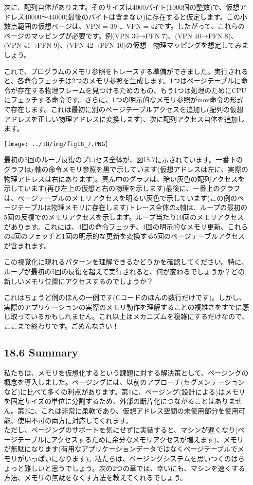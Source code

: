次に、配列自体があります。そのサイズは4000バイト(1000個の整数)で、仮想アドレス40000〜44000(最後のバイトは含まない)に存在すると仮定します。この小数点範囲の仮想ページは、VPN
= 39 \ldots{} VPN =
42です。したがって、これらのページのマッピングが必要です。例(VPN 39→PFN
7)、(VPN 40→PFN 8)、(VPN 41→PFN 9)、(VPN 42→PFN 10)の仮想 -
物理マッピングを想定してみましょう。

これで、プログラムのメモリ参照をトレースする準備ができました。実行されると、各命令フェッチは2つのメモリ参照を生成します。1つはページテーブルに命令が存在する物理フレームを見つけるためのもの、もう1つは処理のためにCPUにフェッチする命令です。さらに、1つの明示的なメモリ参照がmov命令の形式で存在します。これは最初に別のページテーブルアクセスを追加し(配列の仮想アドレスを正しい物理アドレスに変換します)、次に配列アクセス自体を追加します。

\texttt{[image: ../18/img/fig18\_7.PNG]}

最初の5回のループ反復のプロセス全体が、図18.7に示されています。一番下のグラフはy軸の命令メモリ参照を黒で示しています(仮想アドレスは左に、実際の物理アドレスは右にあります)。真ん中のグラフは、暗い灰色の配列アクセスを示しています(再び左上の仮想と右の物理を示します)最後に、一番上のグラフは、ページテーブルのメモリアクセスを明るい灰色で示しています(この例のページテーブルは物理メモリに存在します)トレース全体のx軸は、ループの最初の5回の反復でのメモリアクセスを示します。ループ当たり10回のメモリアクセスがあります。これには、4回の命令フェッチ、1回の明示的なメモリ更新、これらの4回のフェッチと1回の明示的な更新を変換する5回のページテーブルアクセスが含まれます。

この視覚化に現れるパターンを理解できるかどうかを確認してください。特に、ループが最初の5回の反復を超えて実行されると、何が変わるでしょうか？どの新しいメモリ位置にアクセスするのでしょうか？

これはちょうど例のほんの一例です(Cコードのほんの数行だけです)。しかし、実際のアプリケーションの実際のメモリ動作を理解することの複雑さをすでに感じ取っているかもしれません。これ以上はメカニズムを複雑にするだけなので、ここまで終わりです。ごめんなさい！

\hypertarget{summary-11}{%
\subsection*{18.6 Summary}\label{summary-11}}

私たちは、メモリを仮想化するという課題に対する解決策として、ページングの概念を導入しました。ページングには、以前のアプローチ(セグメンテーションなど)に比べて多くの利点があります。第1に、ページング(設計による)はメモリを固定サイズの単位に分割するため、外部の断片化につながることはありません。第2に、これは非常に柔軟であり、仮想アドレス空間の未使用部分を使用可能、使用不可の両方に対応してくれます。\\
ただし、ページングのサポートを気にせずに実装すると、マシンが遅くなり(ページテーブルにアクセスするために余分なメモリアクセスが増えます)、メモリが無駄になります(有用なアプリケーションデータではなくページテーブルでメモリがいっぱいになります)。私たちは、ページングシステムを思いつくのはちょっと難しいと思うでしょう。次の2つの章では、幸いにも、マシンを速くする方法、メモリの無駄をなくす方法を教えてくれるでしょう。

